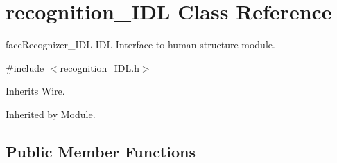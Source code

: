 \section{recognition\+\_\+\+I\+DL Class Reference}
\label{classrecognition__IDL}


face\+Recognizer\+\_\+\+I\+DL I\+DL Interface to human structure module.  




{\ttfamily \#include $<$recognition\+\_\+\+I\+D\+L.\+h$>$}



Inherits Wire.



Inherited by Module.

\subsection*{Public Member Functions}
